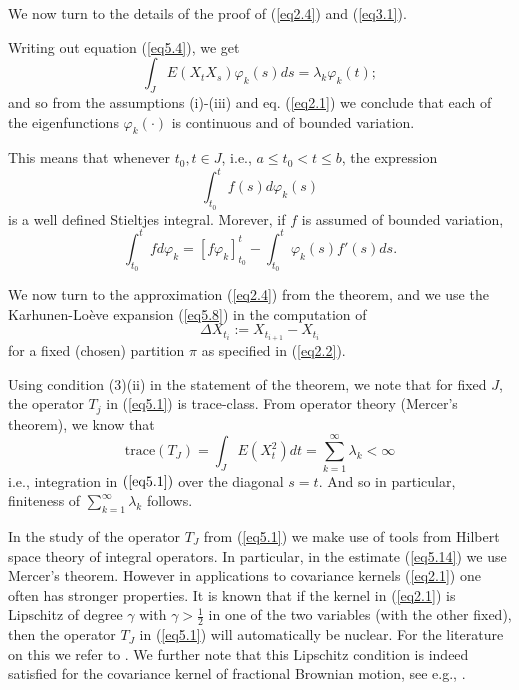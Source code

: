 \documentclass{amsart}
\theoremstyle{definition}
\theoremstyle{remark}
\numberwithin{equation}{section}
\begin{document}
We now turn to the details of the proof of (\ref{eq2.4}) and (\ref{eq3.1}).

Writing out equation (\ref{eq5.4}), we get
\begin{equation}
\label{eq5.10}
  \int_{J}E(X_{t}X_{s})\varphi_{k}(s)ds=\lambda_{k}\varphi_{k}(t);
\end{equation}
and so from the assumptions (i)-(iii) and eq. (\ref{eq2.1}) we conclude that 
each of the eigenfunctions $\varphi_{k}(\cdot)$ is continuous and of bounded 
variation.

This means that whenever $t_{0}, t \in J$, i.e., $a\leq t_{0}<t\leq b$, the 
expression
\begin{equation}
\label{eq5.11}
  \int_{t_{0}}^{t}f(s)d\varphi_{k}(s)
\end{equation}
is a well defined Stieltjes integral.  Morever, if $f$ is assumed of bounded 
variation, 
\begin{equation}
\label{eq5.12}
  \int_{t_{0}}^{t}fd\varphi_{k}=[f\varphi_{k}]_{t_{0}}^{t}-
  \int_{t_{0}}^{t}\varphi_{k}(s)f'(s)ds.
\end{equation}

We now turn to the approximation (\ref{eq2.4}) from the theorem, and we use the 
Karhunen-Lo\`{e}ve expansion (\ref{eq5.8}) in the computation of 
\begin{equation}
\label{eq5.13}
  \Delta X_{t_{i}}:=X_{t_{i+1}}-X_{t_{i}}
\end{equation}
for a fixed (chosen) partition $\pi$ as specified in (\ref{eq2.2}).

Using condition (3)(ii) in the statement of the theorem, we note that for 
fixed $J$, the operator $T_{j}$ in (\ref{eq5.1}) is trace-class.  From 
operator theory (Mercer's theorem), we know that 
\begin{equation}
\label{eq5.14}
  \text{trace}(T_{J})=\int_{J}E(X_{t}^{2})dt
  =\sum_{k=1}^{\infty}\lambda_{k} < \infty
\end{equation}
i.e., integration in $(\ref{eq5.1})$ over the diagonal $s=t$.  And so in 
particular, finiteness of $\sum_{k=1}^{\infty}\lambda_{k}$ follows.

In the study of the operator $T_{J}$ from (\ref{eq5.1}) we make use of 
tools from Hilbert space theory of integral operators. In particular, in 
the estimate (\ref{eq5.14}) we use Mercer's theorem. However in applications 
to covariance kernels (\ref{eq2.1}) one often has stronger properties. It is 
known that if the kernel in (\ref{eq2.1}) is Lipschitz of degree $\gamma$ 
with  $\gamma > \frac{1}{2}$  in one of the two variables (with the 
other fixed), then the operator  $T_{J}$ in (\ref{eq5.1}) will 
automatically be nuclear. For the literature on this we refer to  
\cite{Do93, Ku83,  LL52,  St58}.  We further note that this Lipschitz 
condition is indeed satisfied for the covariance kernel of fractional 
Brownian motion, see e.g., \cite{IA07}.
\end{document}
